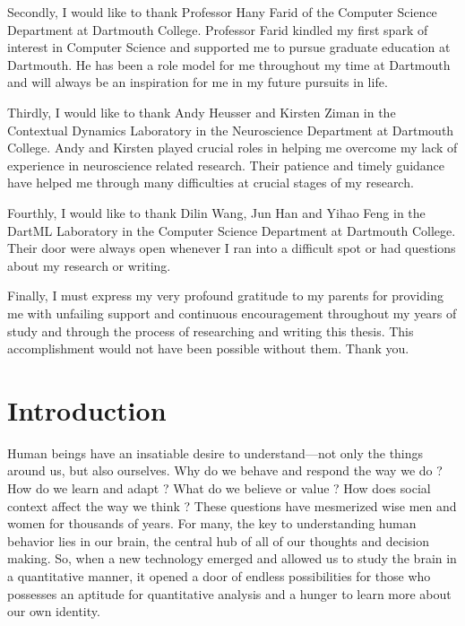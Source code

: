 \documentclass[11pt]{article}
\begin{document}
Secondly, I would like to thank Professor Hany Farid of the Computer Science Department at Dartmouth College. Professor Farid kindled my first spark of interest in Computer Science and supported me to pursue graduate education at Dartmouth. He has been a role model for me throughout my time at Dartmouth and will always be an inspiration for me in my future pursuits in life.

Thirdly, I would like to thank Andy Heusser and Kirsten Ziman in the Contextual Dynamics Laboratory in the Neuroscience Department at Dartmouth College. Andy and Kirsten played crucial roles in helping me overcome my lack of experience in neuroscience related research. Their patience and timely guidance have helped me through many difficulties at crucial stages of my research.

Fourthly, I would like to thank Dilin Wang, Jun Han and Yihao Feng in the DartML Laboratory in the Computer Science Department at Dartmouth College. Their door were always open whenever I ran into a difficult spot or had questions about my research or writing.

Finally, I must express my very profound gratitude to my parents for providing me with unfailing support and continuous encouragement throughout my years of study and through the process of researching and writing this thesis. This accomplishment would not have been possible without them. Thank you.

\newpage
\tableofcontents
\newpage
\listoffigures
\newpage
{}

\section{Introduction}
Human beings have an insatiable desire to understand---not only the things around us, but also ourselves. Why do we behave and respond the way we do \citep{hasson2012}? How do we learn and adapt \citep{hasson2004,hasson2005}? What do we believe or value \citep{Greene01}? How does social context affect the way we think \citep{Matthew2015}? These questions have mesmerized wise men and women for thousands of years. For many, the key to understanding human behavior lies in our brain, the central hub of all of our thoughts and decision making. So, when a new technology emerged and allowed us to study the brain in a quantitative manner, it opened a door of endless possibilities for those who possesses an aptitude for quantitative analysis and a hunger to learn more about our own identity.
\end{document}

